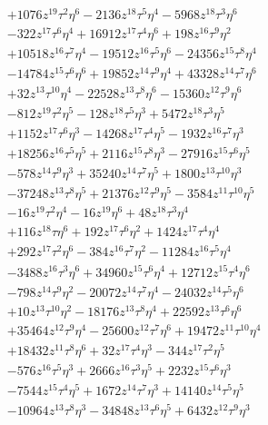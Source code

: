 {\begin{align*}
&+1076z^{19}\tau^{2}\eta^{6}-2136z^{18}\tau^{5}\eta^{4}-5968z^{18}\tau^{3}\eta^{6}\\
&-322z^{17}\tau^{6}\eta^{4}+16912z^{17}\tau^{4}\eta^{6}+198z^{16}\tau^{9}\eta^{2}\\
&+10518z^{16}\tau^{7}\eta^{4}-19512z^{16}\tau^{5}\eta^{6}-24356z^{15}\tau^{8}\eta^{4}\\
&-14784z^{15}\tau^{6}\eta^{6}+19852z^{14}\tau^{9}\eta^{4}+43328z^{14}\tau^{7}\eta^{6}\\
&+32z^{13}\tau^{10}\eta^{4}-22528z^{13}\tau^{8}\eta^{6}-15360z^{12}\tau^{9}\eta^{6}\\
&-812z^{19}\tau^{2}\eta^{5}-128z^{18}\tau^{5}\eta^{3}+5472z^{18}\tau^{3}\eta^{5}\\
&+1152z^{17}\tau^{6}\eta^{3}-14268z^{17}\tau^{4}\eta^{5}-1932z^{16}\tau^{7}\eta^{3}\\
&+18256z^{16}\tau^{5}\eta^{5}+2116z^{15}\tau^{8}\eta^{3}-27916z^{15}\tau^{6}\eta^{5}\\
&-578z^{14}\tau^{9}\eta^{3}+35240z^{14}\tau^{7}\eta^{5}+1800z^{13}\tau^{10}\eta^{3}\\
&-37248z^{13}\tau^{8}\eta^{5}+21376z^{12}\tau^{9}\eta^{5}-3584z^{11}\tau^{10}\eta^{5}\\
&-16z^{19}\tau^{2}\eta^{4}-16z^{19}\eta^{6}+48z^{18}\tau^{3}\eta^{4}\\
&+116z^{18}\tau\eta^{6}+192z^{17}\tau^{6}\eta^{2}+1424z^{17}\tau^{4}\eta^{4}\\
&+292z^{17}\tau^{2}\eta^{6}-384z^{16}\tau^{7}\eta^{2}-11284z^{16}\tau^{5}\eta^{4}\\
&-3488z^{16}\tau^{3}\eta^{6}+34960z^{15}\tau^{6}\eta^{4}+12712z^{15}\tau^{4}\eta^{6}\\
&-798z^{14}\tau^{9}\eta^{2}-20072z^{14}\tau^{7}\eta^{4}-24032z^{14}\tau^{5}\eta^{6}\\
&+10z^{13}\tau^{10}\eta^{2}-18176z^{13}\tau^{8}\eta^{4}+22592z^{13}\tau^{6}\eta^{6}\\
&+35464z^{12}\tau^{9}\eta^{4}-25600z^{12}\tau^{7}\eta^{6}+19472z^{11}\tau^{10}\eta^{4}\\
&+18432z^{11}\tau^{8}\eta^{6}+32z^{17}\tau^{4}\eta^{3}-344z^{17}\tau^{2}\eta^{5}\\
&-576z^{16}\tau^{5}\eta^{3}+2666z^{16}\tau^{3}\eta^{5}+2232z^{15}\tau^{6}\eta^{3}\\
&-7544z^{15}\tau^{4}\eta^{5}+1672z^{14}\tau^{7}\eta^{3}+14140z^{14}\tau^{5}\eta^{5}\\
&-10964z^{13}\tau^{8}\eta^{3}-34848z^{13}\tau^{6}\eta^{5}+6432z^{12}\tau^{9}\eta^{3}\\

\end{align*}}
